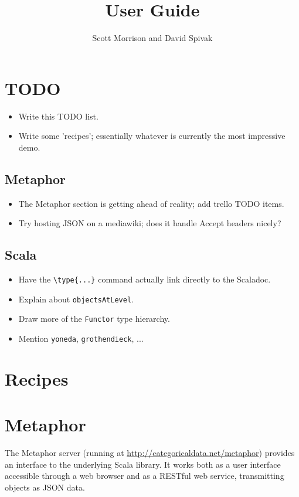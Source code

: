 \documentclass{amsart}
\title{User Guide}
\author{Scott Morrison and David Spivak}
\newcommand{\type}[1]{{\tt #1}}
\newcommand{\code}[1]{{\tt #1}}
\begin{document}
\maketitle

\section{TODO}
\begin{itemize}
\item Write this TODO list.
\item Write some 'recipes'; essentially whatever is currently the most impressive demo.
\end{itemize}

\subsection{Metaphor}
\begin{itemize}
\item The Metaphor section is getting ahead of reality; add trello TODO items.
\item Try hosting JSON on a mediawiki; does it handle Accept headers nicely?
\end{itemize}
\subsection{Scala}
\begin{itemize}
\item Have the \verb+\type{...}+ command actually link directly to the Scaladoc.
\item Explain about \code{objectsAtLevel}.
\item Draw more of the \type{Functor} type hierarchy.
\item Mention \code{yoneda}, \code{grothendieck}, ...
\end{itemize}

\section{Recipes}

\section{Metaphor}
The Metaphor server (running at \url{http://categoricaldata.net/metaphor}) provides an interface to the underlying Scala library. It works both as a user interface accessible through a web browser and as a RESTful web service, transmitting objects as JSON data. 
\end{document}
